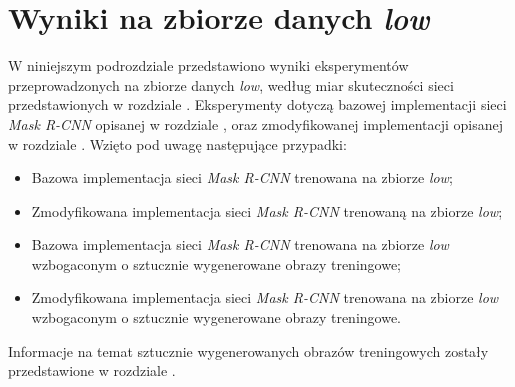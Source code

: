 \section{Wyniki na zbiorze danych \textit{low}}
W niniejszym podrozdziale przedstawiono wyniki eksperymentów przeprowadzonych na zbiorze danych \textit{low}, według miar skuteczności sieci przedstawionych w rozdziale .
Eksperymenty dotyczą bazowej implementacji sieci \textit{Mask R-CNN} \cite{matterport-mask-rcnn} opisanej w rozdziale , oraz zmodyfikowanej implementacji opisanej w rozdziale .
 Wzięto pod uwagę następujące przypadki:

\begin{itemize}
 \item Bazowa implementacja sieci \textit{Mask R-CNN} trenowana na zbiorze \textit{low};
 \item Zmodyfikowana implementacja sieci \textit{Mask R-CNN} trenowaną na zbiorze \textit{low};
 \item Bazowa implementacja sieci \textit{Mask R-CNN} trenowana na zbiorze \textit{low} wzbogaconym o sztucznie wygenerowane obrazy treningowe;
 \item Zmodyfikowana implementacja sieci \textit{Mask R-CNN} trenowana na zbiorze \textit{low} wzbogaconym o sztucznie wygenerowane obrazy treningowe.
\end{itemize}

Informacje na temat sztucznie wygenerowanych obrazów treningowych zostały przedstawione w rozdziale .
